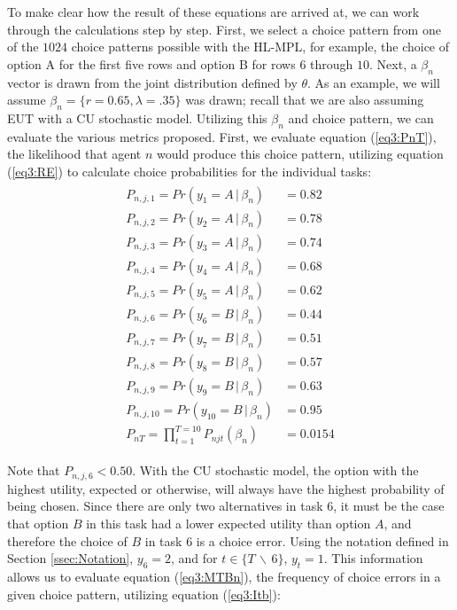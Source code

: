 \documentclass[../main.tex]{subfiles}
\begin{document}
To make clear how the result of these equations are arrived at, we can work through the calculations step by step.
First, we select a choice pattern from one of the $1024$ choice patterns possible with the HL-MPL, for example, the choice of option A for the first five rows and option B for rows $6$ through $10$.
Next, a $\beta_n$ vector is drawn from the joint distribution defined by $\theta$.
As an example, we will assume $\beta_n = \lbrace r = 0.65, \lambda = .35\rbrace$ was drawn; recall that we are also assuming EUT with a CU stochastic model.
Utilizing this $\beta_n$ and choice pattern, we can evaluate the various metrics proposed.
First, we evaluate equation (\ref{eq3:PnT}), the likelihood that agent $n$ would produce this choice pattern, utilizing equation (\ref{eq3:RE}) to calculate choice probabilities for the individual tasks:
\begin{align}
	\label{eq3:example_PnT}
	\begin{split}
		P_{n,j,1}  = Pr(y_1 = A    \,|\, \beta_n)    &= 0.82 \\
		P_{n,j,2}  = Pr(y_2 = A    \,|\, \beta_n)    &= 0.78 \\
		P_{n,j,3}  = Pr(y_3 = A    \,|\, \beta_n)    &= 0.74 \\
		P_{n,j,4}  = Pr(y_4 = A    \,|\, \beta_n)    &= 0.68 \\
		P_{n,j,5}  = Pr(y_5 = A    \,|\, \beta_n)    &= 0.62 \\
		P_{n,j,6}  = Pr(y_6 = B    \,|\, \beta_n)    &= 0.44 \\
		P_{n,j,7}  = Pr(y_7 = B    \,|\, \beta_n)    &= 0.51 \\
		P_{n,j,8}  = Pr(y_8 = B    \,|\, \beta_n)    &= 0.57 \\
		P_{n,j,9}  = Pr(y_9 = B    \,|\, \beta_n)    &= 0.63 \\
		P_{n,j,10} = Pr(y_{10} = B \,|\, \beta_n)    &= 0.95 \\
		P_{nT}     = \prod_{t = 1}^{T = 10} P_{njt}(\beta_n)  &= 0.0154
	\end{split}
\end{align}

\noindent Note that $P_{n,j,6} < 0.50$.
With the CU stochastic model, the option with the highest utility, expected or otherwise, will always have the highest probability of being chosen.
Since there are only two alternatives in task $6$, it must be the case that option $B$ in this task had a lower expected utility than option $A$, and therefore the choice of $B$ in task $6$ is a choice error.
Using the notation defined in Section \ref{ssec:Notation}, $y_6 = 2$, and for $t \in \lbrace T \,\backslash\, 6 \rbrace$, $y_t = 1$.
This information allows us to evaluate equation (\ref{eq3:MTBn}), the frequency of choice errors in a given choice pattern, utilizing equation (\ref{eq3:Itb}):
\end{document}
